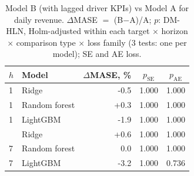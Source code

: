 \begin{table}[t]
\centering
\caption{Model B (with lagged driver KPIs) vs Model A for daily revenue. $\Delta$MASE $=$ (B$-$A)/A; $p$: DM-HLN, Holm-adjusted within each target $\times$ horizon $\times$ comparison type $\times$ loss family (3 tests: one per model); SE and AE loss.}
\label{tab:bva}
\begin{tabular}{llrcc}
\toprule
$h$ & Model & $\Delta$MASE, \% & $p_{\mathrm{SE}}$ & $p_{\mathrm{AE}}$ \\
\midrule
1 & Ridge & -0.5 & 1.000 & 1.000 \\
1 & Random forest & +0.3 & 1.000 & 1.000 \\
1 & LightGBM & -1.9 & 1.000 & 1.000 \\
\addlinespace
7 & Ridge & +0.6 & 1.000 & 1.000 \\
7 & Random forest & 0.0 & 1.000 & 1.000 \\
7 & LightGBM & -3.2 & 1.000 & 0.736 \\
\bottomrule
\end{tabular}
\end{table}
